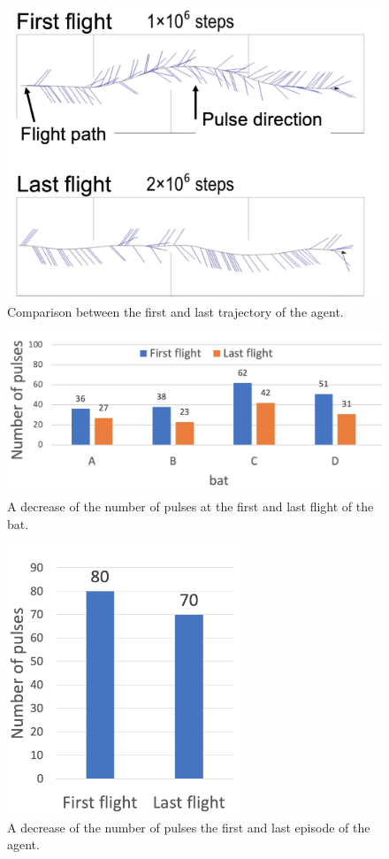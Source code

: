\documentclass[../main]{subfiles}
\begin{document}
\newpage
{}
\begin{figure}[H]
  \centering
  \vfill
  \includegraphics[width=12cm]{figures/agent_trajectory.png}
  \caption{
    Comparison between the first and last trajectory of the agent.
  }\label{fig:agent_trajectory}
\end{figure}

\newpage
{}
\begin{figure}[H]
  \centering
  \vfill
  \includegraphics[width=13cm]{figures/bat_pulses.png}
  \caption{
    A decrease of the number of pulses at the first and last 
    flight of the bat.
  }\label{fig:bat_pulse}
\end{figure}

\newpage
{}
\begin{figure}[H]
  \centering
  \vfill
  \includegraphics[width=7cm]{figures/agent_pulses.png}
  \caption{
    A decrease of the number of pulses 
    the first and last episode of the agent.
  }\label{fig:agent_pulse}
\end{figure}
\end{document}
